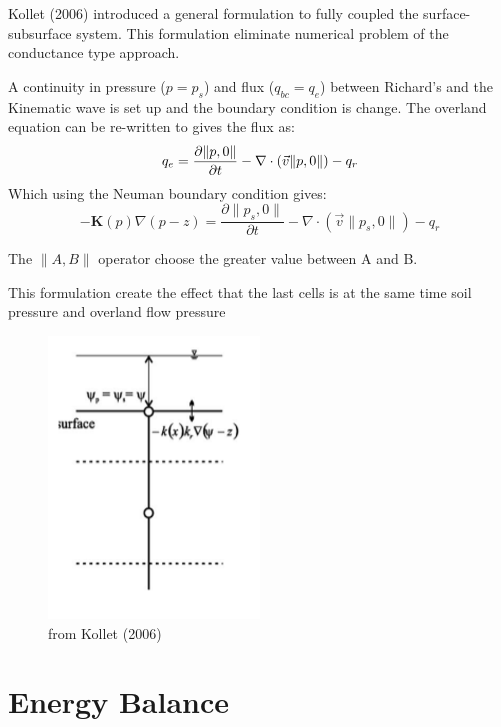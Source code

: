 \documentclass[11pt,a4paper]{report}
\begin{document}
Kollet (2006) introduced a general formulation to fully coupled the surface-subsurface system. This formulation eliminate numerical problem of the conductance type approach. 

A continuity in pressure ($p=p_s$) and flux ($q_{bc}=q_e$) between Richard's and the Kinematic wave is set up and the boundary condition is change. The overland equation can be re-written to gives the flux as:
\begin{equation}
q_e = \frac{\partial \| p,0\|}{\partial t} - \nabla \cdot (\vec{v}\| p,0\|)-q_r \\
\end{equation}
Which using the Neuman boundary condition gives:
\begin{equation}
-\boldsymbol{K}(p) \nabla (p - z) = \frac{\partial\| p_s,0\|}{\partial t} - \nabla \cdot (\vec{v}\|p_s,0\|) - q_r
\end{equation}

The $\| A,B\|$ operator choose the greater value between A and B. 

This formulation create the effect that the last cells is at the same time soil pressure and overland flow pressure

\begin{figure}[hbtp]
\caption{from Kollet (2006)}
\centering
\includegraphics[width=0.5\textwidth]{bcflux.png}
\end{figure}






\section{Energy Balance}
\end{document}
